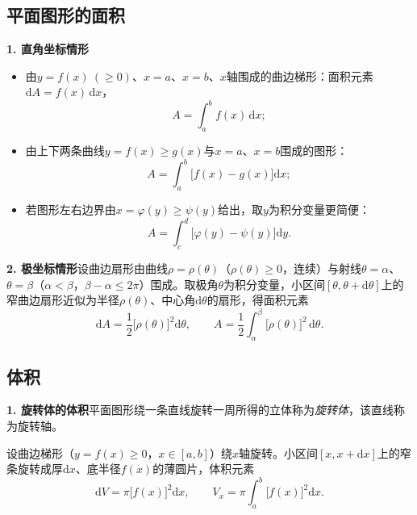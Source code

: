 \subsection{平面图形的面积}

\noindent\textbf{1. 直角坐标情形}
\begin{itemize}
  \item 由$y=f(x)\ (\ge0)$、$x=a$、$x=b$、$x$轴围成的曲边梯形：面积元素$\mathrm{d}A=f(x)\,\mathrm{d}x$，
\[
A=\int_a^bf(x)\,\mathrm{d}x ;
\]
  \item 由上下两条曲线$y=f(x)\ge g(x)$与$x=a$、$x=b$围成的图形：
\[
A=\int_a^b\bigl[f(x)-g(x)\bigr]\mathrm{d}x ;
\]
  \item 若图形左右边界由$x=\varphi(y)\ge\psi(y)$给出，取$y$为积分变量更简便：
\[
A=\int_c^d\bigl[\varphi(y)-\psi(y)\bigr]\mathrm{d}y .
\]
\end{itemize}

\noindent\textbf{2. 极坐标情形}\quad 设曲边扇形由曲线$\rho=\rho(\theta)$（$\rho(\theta)\ge0$，连续）与射线$\theta=\alpha$、$\theta=\beta$（$\alpha<\beta$，$\beta-\alpha\le2\pi$）围成。取极角$\theta$为积分变量，小区间$[\theta,\theta+\mathrm{d}\theta]$上的窄曲边扇形近似为半径$\rho(\theta)$、中心角$\mathrm{d}\theta$的扇形，得面积元素
\[
\mathrm{d}A=\frac{1}{2}\bigl[\rho(\theta)\bigr]^2\mathrm{d}\theta ,
\qquad
A=\frac{1}{2}\int_{\alpha}^{\beta}\bigl[\rho(\theta)\bigr]^2\,\mathrm{d}\theta .
\]



\subsection{体积}

\noindent\textbf{1. 旋转体的体积}\quad 平面图形绕一条直线旋转一周所得的立体称为\emph{旋转体}，该直线称为旋转轴。

\noindent 设曲边梯形（$y=f(x)\ge0$，$x\in[a,b]$）绕$x$轴旋转。小区间$[x,x+\mathrm{d}x]$上的窄条旋转成厚$\mathrm{d}x$、底半径$f(x)$的薄圆片，体积元素
\[
\mathrm{d}V=\pi\bigl[f(x)\bigr]^2\mathrm{d}x ,
\qquad
V_x=\pi\int_a^b\bigl[f(x)\bigr]^2\mathrm{d}x .
\]

